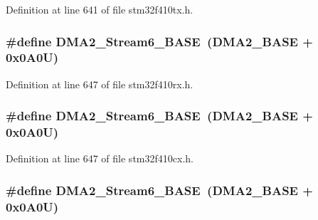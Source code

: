 Definition at line 641 of file stm32f410tx.\+h.

\subsubsection[{\texorpdfstring{D\+M\+A2\+\_\+\+Stream6\+\_\+\+B\+A\+SE}{DMA2_Stream6_BASE}}]{\setlength{\rightskip}{0pt plus 5cm}\#define D\+M\+A2\+\_\+\+Stream6\+\_\+\+B\+A\+SE~({\bf D\+M\+A2\+\_\+\+B\+A\+SE} + 0x0\+A0\+U)}\hypertarget{group___peripheral__registers__structures_ga5e81174c96fd204fa7c82c815e85c8e6}{}\label{group___peripheral__registers__structures_ga5e81174c96fd204fa7c82c815e85c8e6}


Definition at line 647 of file stm32f410rx.\+h.

\subsubsection[{\texorpdfstring{D\+M\+A2\+\_\+\+Stream6\+\_\+\+B\+A\+SE}{DMA2_Stream6_BASE}}]{\setlength{\rightskip}{0pt plus 5cm}\#define D\+M\+A2\+\_\+\+Stream6\+\_\+\+B\+A\+SE~({\bf D\+M\+A2\+\_\+\+B\+A\+SE} + 0x0\+A0\+U)}\hypertarget{group___peripheral__registers__structures_ga5e81174c96fd204fa7c82c815e85c8e6}{}\label{group___peripheral__registers__structures_ga5e81174c96fd204fa7c82c815e85c8e6}


Definition at line 647 of file stm32f410cx.\+h.

\subsubsection[{\texorpdfstring{D\+M\+A2\+\_\+\+Stream6\+\_\+\+B\+A\+SE}{DMA2_Stream6_BASE}}]{\setlength{\rightskip}{0pt plus 5cm}\#define D\+M\+A2\+\_\+\+Stream6\+\_\+\+B\+A\+SE~({\bf D\+M\+A2\+\_\+\+B\+A\+SE} + 0x0\+A0\+U)}\hypertarget{group___peripheral__registers__structures_ga5e81174c96fd204fa7c82c815e85c8e6}{}\label{group___peripheral__registers__structures_ga5e81174c96fd204fa7c82c815e85c8e6}


